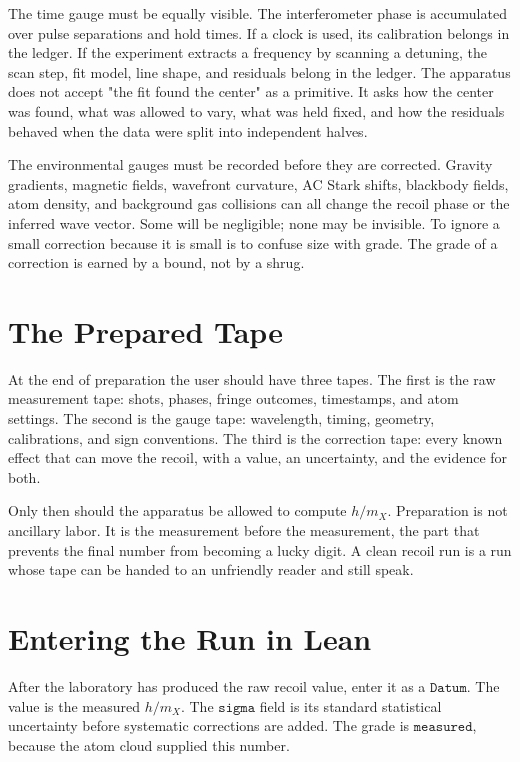 The time gauge must be equally visible. The interferometer phase is accumulated over pulse separations and hold
times. If a clock is used, its calibration belongs in the ledger. If the experiment extracts a frequency by
scanning a detuning, the scan step, fit model, line shape, and residuals belong in the ledger. The apparatus does
not accept "the fit found the center" as a primitive. It asks how the center was found, what was allowed to vary,
what was held fixed, and how the residuals behaved when the data were split into independent halves.

The environmental gauges must be recorded before they are corrected. Gravity gradients, magnetic fields,
wavefront curvature, AC Stark shifts, blackbody fields, atom density, and background gas collisions can all
change the recoil phase or the inferred wave vector. Some will be negligible; none may be invisible. To ignore a
small correction because it is small is to confuse size with grade. The grade of a correction is earned by a
bound, not by a shrug.

\section{The Prepared Tape}

At the end of preparation the user should have three tapes. The first is the raw measurement tape: shots, phases,
fringe outcomes, timestamps, and atom settings. The second is the gauge tape: wavelength, timing, geometry,
calibrations, and sign conventions. The third is the correction tape: every known effect that can move the
recoil, with a value, an uncertainty, and the evidence for both.

Only then should the apparatus be allowed to compute \(h/m_X\). Preparation is not ancillary labor. It is the
measurement before the measurement, the part that prevents the final number from becoming a lucky digit. A clean
recoil run is a run whose tape can be handed to an unfriendly reader and still speak.

\section{Entering the Run in Lean}

After the laboratory has produced the raw recoil value, enter it as a \(\texttt{Datum}\). The value is the
measured \(h/m_X\). The \(\texttt{sigma}\) field is its standard statistical uncertainty before systematic
corrections are added. The grade is \(\texttt{measured}\), because the atom cloud supplied this number.

